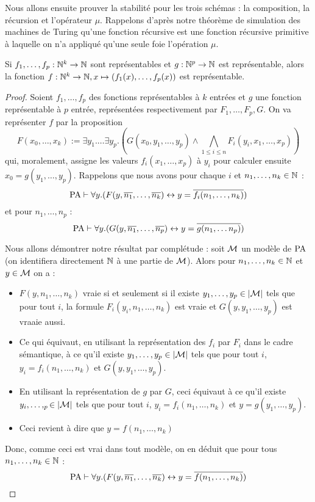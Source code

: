 Nous allons ensuite prouver la stabilité pour les trois schémas : la composition, la récursion et l'opérateur $\mu$. Rappelons d'après notre théorème de simulation des machines de Turing qu'une fonction récursive est une fonction récursive primitive à laquelle on n'a appliqué qu'une seule foie l'opération $\mu$.

\begin{lem}
    Si $f_1,\ldots,f_p : \mathbb{N}^k \to \mathbb{N}$ sont représentables et $g : \mathbb{N}^p \to \mathbb{N}$ est représentable, alors la fonction $f : \mathbb{N}^k\to\mathbb{N}, x \mapsto (f_1(x),\ldots,f_p(x))$ est représentable.
\end{lem}

\begin{proof}
    Soient $f_1,\ldots,f_p$ des fonctions représentables à $k$ entrées et $g$ une fonction représentable à $p$ entrée, représentées respectivement par $F_1,\ldots,F_p,G$. On va représenter $f$ par la proposition $$F(x_0,\ldots,x_k) := \exists y_1.\ldots \exists y_p. (G(x_0,y_1,\ldots,y_p)\land \bigwedge_{1\leq i \leq n}F_i(y_i,x_1,\ldots,x_p))$$ qui, moralement, assigne les valeurs $f_i(x_1,\ldots,x_p)$ à $y_i$ pour calculer ensuite $x_0 = g(y_1,\ldots,y_p)$. Rappelons que nous avons pour chaque $i$ et $n_1,\ldots,n_k\in\mathbb{N}$ : $$\mathrm{PA}\vdash \forall y.(F(y,\overline{n_1},\ldots,\overline{n_k}) \leftrightarrow y= \overline{f_i(n_1,\ldots,n_k)})$$ et pour $n_1,\ldots,n_p$ : $$\mathrm{PA}\vdash \forall y.(G(y,\overline{n_1},\ldots,\overline{n_p})\leftrightarrow y=\overline{g(n_1,\ldots n_p)})$$

    Nous allons démontrer notre résultat par complétude : soit $\mathcal M$ un modèle de $\mathrm{PA}$ (on identifiera directement $\mathbb{N}$ à une partie de $\mathcal M$). Alors pour $n_1,\ldots,n_k\in\mathbb{N}$ et $y\in\mathcal M$ on a :
    \begin{itemize}[label=$\bullet$]
        \item $F(y,n_1,\ldots,n_k)$ vraie si et seulement si il existe $y_1,\ldots,y_p\in|\mathcal M|$ tels que pour tout $i$, la formule $F_i(y_i,n_1,\ldots,n_k)$ est vraie et $G(y,y_1,\ldots,y_p)$ est vraaie aussi.
        \item Ce qui équivaut, en utilisant la représentation des $f_i$ par $F_i$ dans le cadre sémantique, à ce qu'il existe $y_1,\ldots,y_p\in|\mathcal M|$ tels que pour tout $i$, $y_i = f_i(n_1,\ldots,n_k)$ et $G(y,y_1,\ldots,y_p)$.
        \item En utilisant la représentation de $g$ par $G$, ceci équivaut à ce qu'il existe $y_i,\ldots,_p\in|\mathcal M|$ tels que pour tout $i$, $y_i = f_i(n_1,\ldots,n_k)$ et $y=g(y_1,\ldots,y_p)$.
        \item Ceci revient à dire que $y = f(n_1,\ldots,n_k)$
    \end{itemize}

    Donc, comme ceci est vrai dans tout modèle, on en déduit que pour tous $n_1,\ldots,n_k\in\mathbb{N}$ : $$\mathrm{PA}\vdash \forall y.(F(y,\overline{n_1},\ldots,\overline{n_k}) \leftrightarrow y = \overline{f(n_1,\ldots,n_k)})$$
\end{proof}


